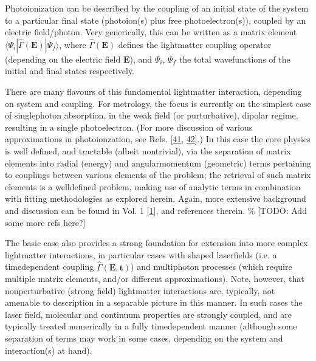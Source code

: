 \documentclass[letterpaper,table,10pt,english]{jupyterBook}
\begin{document}
\sphinxAtStartPar
Photoionization can be described by the coupling of an initial state of the system to a particular final state (photoion(s) plus free photoelectron(s)), coupled by an electric field/photon. Very generically, this can be written as a matrix element \(\langle\Psi_i|\hat{\Gamma}(\boldsymbol{\mathbf{E}})|\Psi_f\rangle\), where \(\hat{\Gamma}(\boldsymbol{\mathbf{E}})\) defines the light\sphinxhyphen{}matter coupling operator (depending on the electric field \(\boldsymbol{\mathbf{E}}\)), and \(\Psi_i\), \(\Psi_f\) the total wavefunctions of the initial and final states respectively.

\sphinxAtStartPar
There are many flavours of this fundamental light\sphinxhyphen{}matter interaction, depending on system and coupling. For metrology, the focus is currently on the simplest case of single\sphinxhyphen{}photon absorption, in the weak field (or purturbative), dipolar regime, resulting in a single photoelectron. (For more discussion of various approximations in photoionzation, see Refs. {[}\hyperlink{cite.backmatter/bibliography:id736}{41}, \hyperlink{cite.backmatter/bibliography:id735}{42}{]}.) In this case the core physics is well defined, and tractable (albeit non\sphinxhyphen{}trivial), via the separation of matrix elements into radial (energy) and angular\sphinxhyphen{}momentum (geometric) terms pertaining to couplings between various elements of the problem; the retrieval of such matrix elements is a well\sphinxhyphen{}defined problem, making use of analytic terms in combination with fitting methodologies as explored herein. Again, more extensive background and discussion can be found in  Vol. 1 {[}\hyperlink{cite.backmatter/bibliography:id569}{1}{]}, and references therein. \% {[}TODO: Add some more refs here?{]}

\sphinxAtStartPar
The basic case also provides a strong foundation for extension into more complex light\sphinxhyphen{}matter interactions, in particular cases with shaped laser\sphinxhyphen{}fields (i.e. a time\sphinxhyphen{}dependent coupling \(\hat{\Gamma}(\boldsymbol{\mathbf{E,t}})\)) and multi\sphinxhyphen{}photon processes (which require multiple matrix elements, and/or different approximations). Note, however, that non\sphinxhyphen{}perturbative (strong field) light\sphinxhyphen{}matter interactions are, typically, not amenable to description in a separable picture in this manner. In such cases the laser field, molecular and continuum properties are strongly coupled, and are typically treated numerically in a fully time\sphinxhyphen{}dependent manner (although some separation of terms may work in some cases, depending on the system and interaction(s) at hand).
\end{document}
